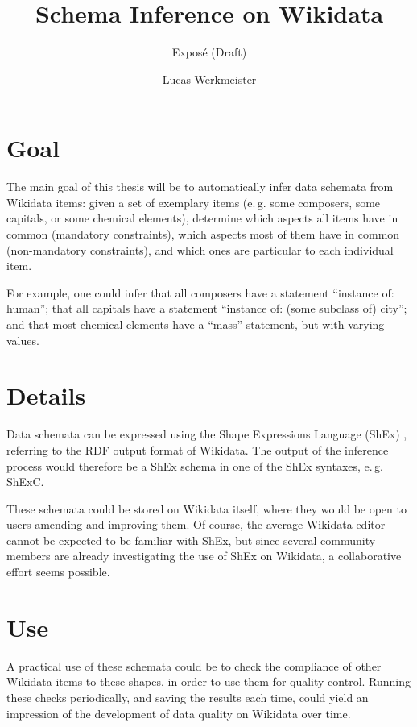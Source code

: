 \documentclass{scrartcl}
\title{Schema Inference on Wikidata}
\subtitle{Exposé (Draft)}
\author{Lucas Werkmeister}
\begin{document}
\maketitle

\section{Goal}

The main goal of this thesis will be to automatically infer data schemata from Wikidata items:
given a set of exemplary items (e.\,g. some composers, some capitals, or some chemical elements),
determine which aspects all items have in common (mandatory constraints),
which aspects most of them have in common (non-mandatory constraints),
and which ones are particular to each individual item.

For example, one could infer that all composers have a statement “instance of: human”;
that all capitals have a statement “instance of: (some subclass of) city”;
and that most chemical elements have a “mass” statement, but with varying values.

\section{Details}

Data schemata can be expressed using the Shape Expressions Language (ShEx) \cite{Prud'hommeaux:2014:SER:2660517.2660523},
referring to the RDF output format of Wikidata.
The output of the inference process would therefore be a ShEx schema in one of the ShEx syntaxes, e.\,g. ShExC.

These schemata could be stored on Wikidata itself,
where they would be open to users amending and improving them.
Of course, the average Wikidata editor cannot be expected to be familiar with ShEx,
but since several community members are already investigating the use of ShEx on Wikidata,
a collaborative effort seems possible.

\section{Use}

A practical use of these schemata could be to check the compliance of other Wikidata items to these shapes,
in order to use them for quality control.
Running these checks periodically, and saving the results each time,
could yield an impression of the development of data quality on Wikidata over time.
\end{document}
